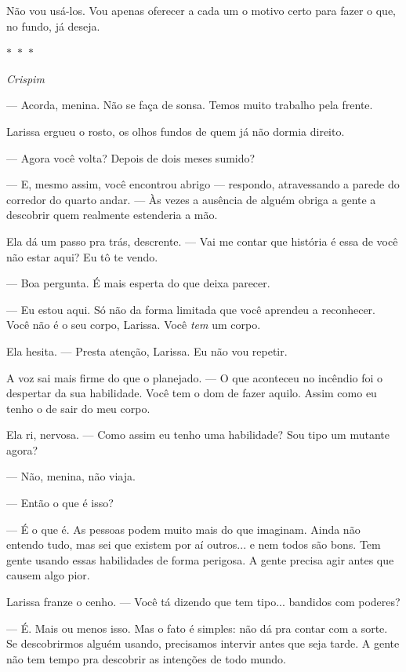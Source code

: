 Não vou usá-los. Vou apenas oferecer a cada um o motivo certo para fazer o que, no fundo, já deseja.

\begin{center}
$\ast$~$\ast$~$\ast$

\textit{Crispim}
\end{center}

— Acorda, menina. Não se faça de sonsa. Temos muito trabalho pela frente.

Larissa ergueu o rosto, os olhos fundos de quem já não dormia direito.

— Agora você volta? Depois de dois meses sumido?  

— E, mesmo assim, você encontrou abrigo — respondo, atravessando a parede do corredor do quarto andar. — Às vezes a ausência de alguém obriga a gente a descobrir quem realmente estenderia a mão.

Ela dá um passo pra trás, descrente.  
— Vai me contar que história é essa de você não estar aqui? Eu tô te vendo.

— Boa pergunta. É mais esperta do que deixa parecer.

— Eu estou aqui. Só não da forma limitada que você aprendeu a reconhecer. Você não é o seu corpo, Larissa. Você \emph{tem} um corpo.

Ela hesita.  
— Presta atenção, Larissa. Eu não vou repetir.  

A voz sai mais firme do que o planejado.  
— O que aconteceu no incêndio foi o despertar da sua habilidade.  
Você tem o dom de fazer aquilo.  
Assim como eu tenho o de sair do meu corpo.  

Ela ri, nervosa.  
— Como assim eu tenho uma habilidade? Sou tipo um mutante agora?

— Não, menina, não viaja.  

— Então o que é isso?  

— É o que é. As pessoas podem muito mais do que imaginam.  
Ainda não entendo tudo, mas sei que existem por aí outros... e nem todos são bons.  
Tem gente usando essas habilidades de forma perigosa.  
A gente precisa agir antes que causem algo pior.

Larissa franze o cenho.  
— Você tá dizendo que tem tipo... bandidos com poderes?

— É. Mais ou menos isso.  
Mas o fato é simples: não dá pra contar com a sorte.  
Se descobrirmos alguém usando, precisamos intervir antes que seja tarde.  
A gente não tem tempo pra descobrir as intenções de todo mundo.

